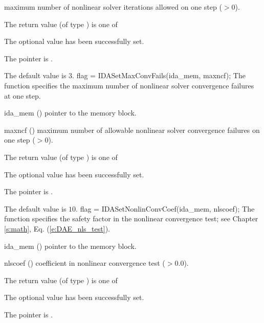 {{\begin{args}
    maximum number of nonlinear solver iterations allowed on one step ($>0$).
  \end{args}
}
{
  The return value  (of type ) is one of
  \begin{args}
  \item[\Id{IDA\_SUCCESS}] 
    The optional value has been successfully set.
  \item[\Id{IDA\_MEM\_NULL}]
    The  pointer is .
  \end{args}
}
{
  The default value is $3$.
}
{
flag = IDASetMaxConvFails(ida\_mem, maxncf);
}
{
  The function  specifies the
  maximum number of nonlinear solver convergence failures at one step.
}
{
  \begin{args}
  \item[ida\_mem] ()
    pointer to the {\idas} memory block.
  \item[maxncf] ()
    maximum number of allowable nonlinear solver convergence failures
    on one step ($>0$).
  \end{args}
}
{
  The return value  (of type ) is one of
  \begin{args}
  \item[\Id{IDA\_SUCCESS}] 
    The optional value has been successfully set.
  \item[\Id{IDA\_MEM\_NULL}]
    The  pointer is .
  \end{args}
}
{
  The default value is $10$.
}
{
flag = IDASetNonlinConvCoef(ida\_mem, nlscoef);
}
{
  The function  specifies the safety factor
  in the nonlinear convergence test;
  see Chapter \ref{s:math}, Eq. (\ref{e:DAE_nls_test}).
}
{
  \begin{args}
  \item[ida\_mem] ()
    pointer to the {\idas} memory block.
  \item[nlscoef] ()
    coefficient in nonlinear convergence test ($>0.0$).
  \end{args}
}
{
  The return value  (of type ) is one of
  \begin{args}
  \item[\Id{IDA\_SUCCESS}] 
    The optional value has been successfully set.
  \item[\Id{IDA\_MEM\_NULL}]
    The  pointer is .

\end{args}}}
